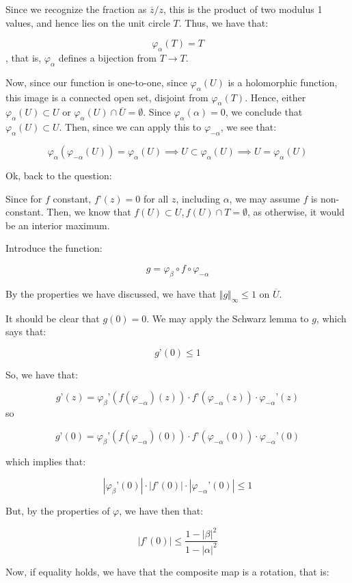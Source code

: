 \documentclass[10pt]{article}
\begin{document}
Since we recognize the fraction as $\overline{z}/z$, this is the product of two modulus 1 values, and hence lies on the unit circle $T$. Thus, we have that:

$$\varphi_\alpha(T)= T$$, that is, $\varphi_\alpha$ defines a bijection from $T \to T$.

Now, since our function is one-to-one, since $\varphi_\alpha(U)$ is a holomorphic function, this image is a connected open set, disjoint from $\varphi_{\alpha}(T)$. Hence, either $\varphi_\alpha(U) \subset U$ or $\varphi_\alpha(U) \cap \overline{U} = \emptyset$. Since $\varphi_\alpha(\alpha) = 0$, we conclude that $\varphi_\alpha(U) \subset U$. Then, since we can apply this to $\varphi_{-\alpha}$, we see that:

$$\varphi_\alpha(\varphi_{-\alpha}(U)) = \varphi_\alpha(U) \implies U \subset \varphi_\alpha(U) \implies U = \varphi_\alpha(U)$$

Ok, back to the question:

Since for $f$ constant, $f’(z) = 0$ for all $z$, including $\alpha$, we may assume $f$ is non-constant. Then, we know that $f(U) \subset U, f(U) \cap T = \emptyset$, as otherwise, it would be an interior maximum.

Introduce the function:

$$g  = \varphi_\beta \circ f \circ \varphi_{-\alpha}$$

By the properties we have discussed, we have that $\Vert g \Vert_\infty \leq 1$ on $\overline{U}$.

It should be clear that $g(0) = 0$. We may apply the Schwarz lemma to $g$, which says that:

$$g’(0) \leq 1$$

So, we have that:

$$g’(z) = \varphi_\beta’(f(\varphi_{-\alpha})(z)) \cdot f’(\varphi_{-\alpha}(z)) \cdot \varphi_{-\alpha}’(z)$$ so

$$g’(0) =  \varphi_\beta’(f(\varphi_{-\alpha})(0)) \cdot f’(\varphi_{-\alpha}(0)) \cdot \varphi_{-\alpha}’(0)$$

which implies that:

$$ |\varphi_\beta’(0) | \cdot |f’(0)| \cdot |\varphi_{-\alpha}’(0)| \leq 1$$

But, by the properties of $\varphi$, we have then that:

$$| f’(0) |  \leq \frac{1 - |\beta|^2}{1 - |\alpha|^2}$$

Now, if equality holds, we have that the composite map is a rotation, that is:
\end{document}
